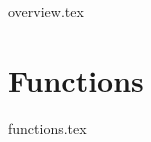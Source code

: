 \documentclass[dvipsnames]{scrreprt}
\title{\projectname}
\author{John Moser}
\begin{document}
	\maketitle

	\tableofcontents

	{overview.tex}
	\part{Functions}
	{functions.tex}
\end{document}
